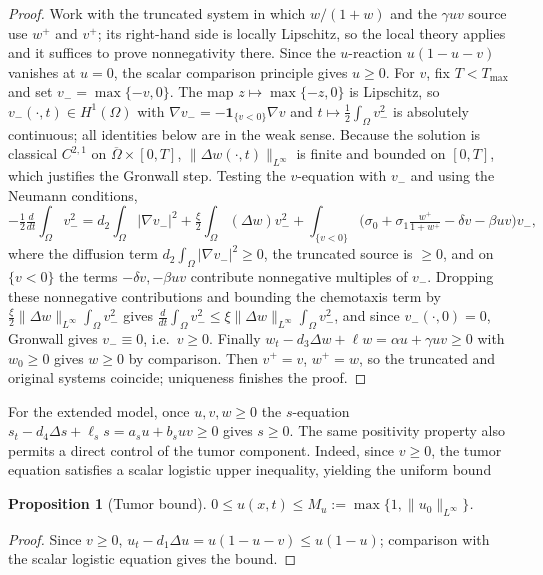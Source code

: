 \documentclass[]{interact}
\theoremstyle{plain}%
\newtheorem{proposition}[theorem]{Proposition}
\theoremstyle{definition}
\theoremstyle{remark}
\newcommand{\Om}{\Omega}
\begin{document}
\begin{proof}
Work with the truncated system in which $w/(1+w)$ and the $\gamma uv$ source use
$w^+$ and $v^+$; its right-hand side is locally Lipschitz, so the local theory
applies and it suffices to prove nonnegativity there. Since the $u$-reaction
$u(1-u-v)$ vanishes at $u=0$, the scalar comparison principle gives $u\ge0$. For
$v$, fix $T<T_{\max}$ and set $v_-=\max\{-v,0\}$. The map $z\mapsto\max\{-z,0\}$
is Lipschitz, so $v_-(\cdot,t)\in H^1(\Om)$ with
$\nabla v_-=-\mathbf 1_{\{v<0\}}\nabla v$ and
$t\mapsto\frac12\int_\Om v_-^2$ is absolutely continuous; all identities below
are in the weak sense. Because the solution is classical
$C^{2,1}$ on $\overline\Om\times[0,T]$, $\|\Delta w(\cdot,t)\|_{L^\infty}$ is
finite and bounded on $[0,T]$, which justifies the Gronwall step. Testing the
$v$-equation with $v_-$ and using the Neumann conditions,
\[
-\tfrac12\tfrac{d}{dt}\!\int_\Om v_-^2
= d_2\!\int_\Om|\nabla v_-|^2 +\tfrac{\xi}{2}\!\int_\Om(\Delta w)v_-^2
+\int_{\{v<0\}}\!\Big(\sigma_0+\sigma_1\tfrac{w^+}{1+w^+}-\delta v-\beta uv\Big)v_-,
\]
where the diffusion term $d_2\!\int_\Om|\nabla v_-|^2\ge0$, the truncated source
is $\ge0$, and on $\{v<0\}$ the terms $-\delta v,-\beta uv$ contribute
nonnegative multiples of $v_-$. Dropping these nonnegative contributions and
bounding the chemotaxis term by
$\tfrac{\xi}{2}\|\Delta w\|_{L^\infty}\!\int_\Om v_-^2$ gives
$\frac{d}{dt}\int_\Om v_-^2\le\xi\|\Delta w\|_{L^\infty}\int_\Om v_-^2$, and
since $v_-(\cdot,0)=0$, Gronwall gives $v_-\equiv0$, i.e.\ $v\ge0$. Finally
$w_t-d_3\Delta w+\ell w=\alpha u+\gamma uv\ge0$ with $w_0\ge0$ gives $w\ge0$ by
comparison. Then $v^+=v$, $w^+=w$, so the truncated and original systems
coincide; uniqueness finishes the proof.
\end{proof}

For the extended model, once $u,v,w\ge0$ the $s$-equation
$s_t-d_4\Delta s+\ell_s s=a_su+b_suv\ge0$ gives $s\ge0$. The same positivity
property also permits a direct control of the tumor component. Indeed, since
$v\ge0$, the tumor equation satisfies a scalar logistic upper inequality, yielding
the uniform bound
\begin{proposition}[Tumor bound]\label{app:prop:u_bound}
$0\le u(x,t)\le M_u:=\max\{1,\|u_0\|_{L^\infty}\}$.
\end{proposition}

\begin{proof}
Since $v\ge0$, $u_t-d_1\Delta u=u(1-u-v)\le u(1-u)$; comparison with the scalar
logistic equation gives the bound.
\end{proof}
\end{document}
